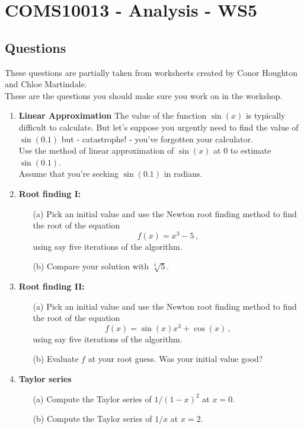 \documentclass[11pt,a4paper]{scrartcl}
\begin{document}
\section*{COMS10013 - Analysis - WS5}

\subsection*{Questions}

These questions are partially taken from worksheets created by Conor Houghton and Chloe Martindale. \\

These are the questions you should make sure you work on in the workshop.

\begin{enumerate}
\item {\textbf{Linear Approximation}}
The value of the function $\sin(x)$ is typically difficult to calculate. But let's suppose you urgently need to find the value of $\sin(0.1)$ but - catastrophe! - you've forgotten your calculator. \\
Use the method of linear approximation of $\sin(x)$ at $0$ to estimate $\sin(0.1)$. \\
Assume that you're seeking $\sin(0.1)$ in radians. 


\item {\textbf{Root finding I: }}
\begin{enumerate}
    \item[(a)] Pick an initial value and use the Newton root finding method to find the root of the equation 
    \[
    f(x) = x^3 - 5\,,
    \]
    using say five iterations of the algorithm.
    \item[(b)] Compare your solution with $\sqrt[3]{5}$.
\end{enumerate}

\item {\textbf{Root finding II: }}
\begin{enumerate}
    \item[(a)] Pick an initial value and use the Newton root finding method to find the root of the equation 
    \[
    f(x) = \sin(x)x^3 + \cos(x)\,,
    \]
    using say five iterations of the algorithm.
    \item[(b)] Evaluate $f$ at your root guess. Was your initial value good?\end{enumerate}

	\item \textbf{Taylor series}
	\begin{itemize}
		\item[(a)] Compute the Taylor series of $1/(1-x)^2$ at $x=0$.
		\item[(b)] Compute the Taylor series of $1/x$ at $x=2$. 
	\end{itemize}


\end{enumerate}
\end{document}
